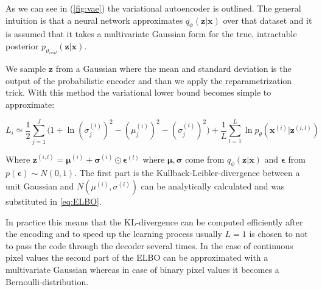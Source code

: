 \documentclass[12pt, english]{article}
\begin{document}
\vspace{4mm}

\par As we can see in (\ref{fig:vae}) the variational autoencoder is outlined. The general intuition is that a neural network approximates $q_{\phi}(\bm{z} | \bm{x})$ over that dataset and it is assumed that it takes a multivariate Gaussian form for the true, intractable posterior $p_{\vartheta_{real}}(\bm{z} | \bm{x})$.

\vspace{4mm}

\par We sample $\bm{z}$ from a Gaussian where the mean and standard deviation is the output of the probabilistic encoder and than we apply the reparametrization trick. With this method the variational lower bound becomes simple to approximate:

\vspace{4mm}

\begin{equation}
    L_{i} \simeq \frac{1}{2}\sum_{j = 1}^{J}\Big( 1 + \ln(\sigma^{(i)}_{j})^{2} - (\mu^{(i)}_{j})^{2} - (\sigma^{(i)}_{j})^{2} \Big) + \frac{1}{L}\sum_{l=1}^{L}\ln p_{\theta}(\bm{x}^{(i)} | \bm{z}^{(i, l)})
    \label{eq:ELBO}
\end{equation}

\vspace{4mm}

\par Where $\bm{z}^{(i, l)} = \bm{\mu}^{(i)} + \bm{\sigma}^{(i)} \odot \bm{\epsilon}^{(l)}$ where $\bm{\mu}, \bm{\sigma}$ come from $q_{\phi}(\bm{z} | \bm{x})$ and $\bm{\epsilon}$ from $p(\bm{\epsilon}) \sim N(0, 1)$. The first part is the Kullback-Leibler-divergence between a unit Gaussian and $N(\mu^{(i)}, \sigma^{(i)})$ can be analytically calculated and was substituted in \ref{eq:ELBO}.

\vspace{4mm}

\par In practice this means that the KL-divergence can be computed efficiently after the encoding and to speed up the learning process usually $L = 1$ is chosen to not to pass the code through the decoder several times. In the case of continuous pixel values the second part of the ELBO can be approximated with a multivariate Gaussian whereas in case of binary pixel values it becomes a Bernoulli-distribution. 

\vspace{5mm}
\end{document}

